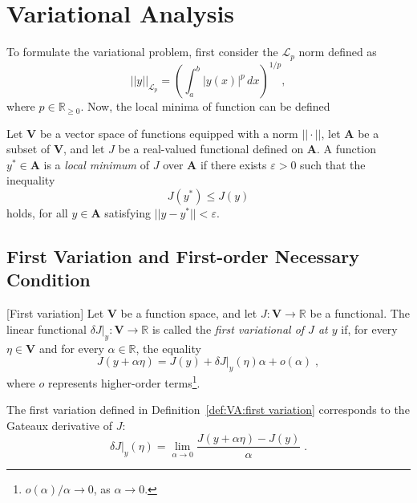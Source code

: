 
\chapter{Variational Analysis}\label{sec:VA}

To formulate the variational problem, first consider the $\mathcal{L}_p$
norm defined as
\begin{equation}\label{eq:lp norm}
	||y||_{\mathcal{L}_p}=\left(\int_a^b |y(x)|^p\,dx\right)^{1/p},
\end{equation}
where $p\in\mathbb{R}_{\geq0}$. Now, the local minima of function can be
defined

\begin{definition}\label{def:VA:local minima}
	Let $\mathbf{V}$ be a vector space of functions equipped with a norm 
	$||\cdot||$, let $\mathbf{A}$ be a subset of $\mathbf{V}$, and let 
	$J$ be a real-valued functional defined on $\mathbf{A}$. A function 
	$y^\ast\in \mathbf{A}$ is a \emph{local minimum} of $J$ over 
	$\mathbf{A}$ if there exists $\varepsilon>0$ such that the inequality
	$$J(y^\ast)\leq J(y)$$
	holds, for all $y\in \mathbf{A}$ satisfying $||y-y^\ast||<\varepsilon$.
\end{definition}

\section{First Variation and First-order Necessary Condition}

\begin{definition}\label{def:VA:first variation}[First variation]
	Let $\mathbf{V}$ be a function space, and let 
	$J:\mathbf{V}\to\mathbb{R}$ be a functional. The linear functional
	$\delta J|_y:\mathbf{V}\to\mathbb{R}$ is called the \emph{first 
	variational of $J$ at $y$} if, for every $\eta\in\mathbf{V}$ and for
	every $\alpha\in\mathbb{R}$, the equality
	\begin{equation}\label{eq:VA:first variational expansion}
		J(y+\alpha\eta) = J(y) + \delta J|_y(\eta)\alpha + o(\alpha)\;,
	\end{equation}
	where $o$ represents higher-order terms\footnote{$o(\alpha)/\alpha\to0$, 
	as $\alpha\to0$.}.
\end{definition}

The first variation defined in Definition~\ref{def:VA:first variation} 
corresponds to the Gateaux derivative of $J$:
\[\delta J|_y(\eta)=\lim_{\alpha\to0}\dfrac{J(y+\alpha\eta)-J(y)}{\alpha}\;.\]

